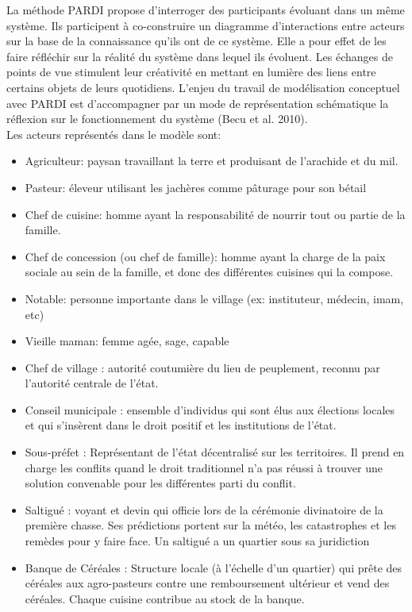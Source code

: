 \vspace{0.5cm}

La méthode PARDI propose d'interroger des participants évoluant dans un même système. Ils participent à co-construire un diagramme d'interactions entre acteurs sur la base de la connaissance qu'ils ont de ce système. Elle a pour effet de les faire réfléchir sur la réalité du système dans lequel ils évoluent. Les échanges de points de vue stimulent leur créativité en mettant en lumière des liens entre certains objets de leurs quotidiens. L'enjeu du travail de modélisation conceptuel avec PARDI est d'accompagner par un mode de représentation schématique la réflexion sur le fonctionnement du système (Becu et al. 2010).\\


Les acteurs représentés dans le modèle sont:
\begin{itemize}
  \item Agriculteur: paysan travaillant la terre et produisant de l'arachide et du mil.
  \item Pasteur: éleveur utilisant les jachères comme pâturage pour son bétail
  \item Chef de cuisine: homme ayant la responsabilité de nourrir tout ou partie de la famille.
  \item Chef de concession (ou chef de famille): homme ayant la charge de la paix sociale au sein de la famille, et donc des différentes cuisines qui la compose.
  \item Notable: personne importante dans le village (ex: instituteur, médecin, imam, etc)
  \item Vieille maman:  femme agée, sage, capable
  \item Chef de village : autorité coutumière du lieu de peuplement, reconnu par l'autorité centrale de l'état.
  \item Conseil municipale : ensemble d'individus qui sont élus aux élections locales et qui s'insèrent dans le droit positif et les institutions de l'état.
  \item Sous-préfet : Représentant de l'état décentralisé sur les territoires. Il prend en charge les conflits quand le droit traditionnel n'a pas réussi à trouver une solution convenable pour les différentes parti du conflit.
  \item Saltigué : voyant et devin qui officie lors de la cérémonie divinatoire de la première chasse. Ses prédictions portent sur la météo, les catastrophes et les remèdes pour y faire face. Un saltigué a un quartier sous sa juridiction
  \item Banque de Céréales : Structure locale (à l'échelle d'un quartier) qui prête des céréales aux agro-pasteurs contre une remboursement ultérieur et vend des céréales. Chaque cuisine contribue au stock de la banque.
\end{itemize}

